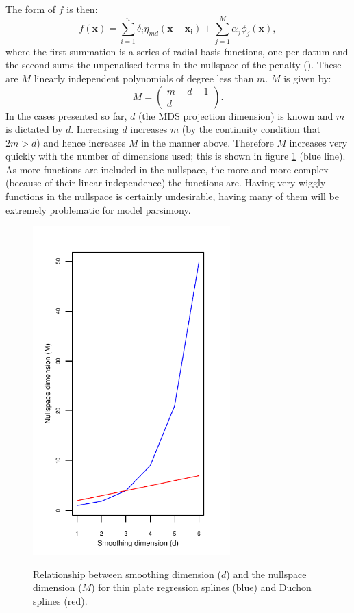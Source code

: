 The form of $f$ is then:
\begin{equation}
f(\mathbf{x}) = \sum_{i=1}^n \delta_i \eta_{md}(\mathbf{x}-\mathbf{x_i}) + \sum_{j=1}^M \alpha_j \phi_j(\mathbf{x}),
\label{tprs-basis}
\end{equation}
where the first summation is a series of radial basis functions, one per datum and the second sums the unpenalised terms in the nullspace of the penalty (\cite{wood2003}). These are $M$ linearly independent polynomials of degree less than $m$. $M$ is given by:
\begin{equation*}
M=\begin{pmatrix} m+d-1 \\ d  \end{pmatrix}.
\end{equation*}
In the cases presented so far, $d$ (the MDS projection dimension) is known and $m$ is dictated by $d$. Increasing $d$ increases $m$ (by the continuity condition that $2m>d$) and hence increases $M$ in the manner above. Therefore $M$ increases very quickly with the number of dimensions used; this is shown in figure \ref{nullspace-dim} (blue line). As more functions are included in the nullspace, the more and more complex (because of their linear independence) the functions are. Having very wiggly functions in the nullspace is certainly undesirable, having many of them will be extremely problematic for model parsimony. 

\begin{figure}
\centering
\includegraphics[width=3in]{gds/figs/nullspace-dim.pdf} \\
\caption{Relationship between smoothing dimension ($d$) and the nullspace dimension ($M$) for thin plate regression splines (blue) and Duchon splines (red).}
\label{nullspace-dim}
\end{figure}

